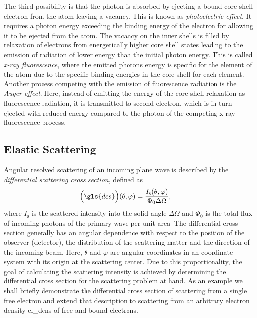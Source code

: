 \begin{description}
          {The third possibility is that the photon is absorbed by ejecting a bound core shell electron from the atom leaving a vacancy. This is known as \emph{photoelectric effect}. It requires a photon energy exceeding the binding energy of the electron for allowing it to be ejected from the atom. The vacancy on the inner shells is filled by relaxation of electrons from energetically higher core shell states leading to the emission of radiation of lower energy than the initial photon energy. This is called \emph{x-ray fluorescence}, where the emitted photons energy is specific for the element of the atom due to the specific binding energies in the core shell for each element. Another process competing with the emission of fluorescence radiation is the \emph{Auger effect}. Here, instead of emitting the energy of the core shell relaxation as fluorescence radiation, it is transmitted to second electron, which is in turn ejected with reduced energy compared to the photon of the competing x-ray fluorescence process.}
\end{description}

\subsection{Elastic Scattering} \label{ch_theo:sec_elastic_scattering}
Angular resolved scattering of an incoming plane wave is described by the \emph{differential scattering cross section}, defined as
\begin{align}
\Big(\gls{dcs}\Big)(\theta, \varphi) &= \frac{I_\text{s}(\theta, \varphi)}{\Phi_0 \Delta \Omega}\text{,}
\end{align}
where $I_\text{s}$ is the scattered intensity into the solid angle $\Delta \Omega$ and $\Phi_0$ is the total flux of incoming photons of the primary wave per unit area. The differential cross section generally has an angular dependence with respect to the position of the observer (detector), the distribution of the scattering matter and the direction of the incoming beam. Here, $\theta$ and $\varphi$ are angular coordinates in an coordinate system with its origin at the scattering center. Due to this proportionality, the goal of calculating the scattering intensity is achieved by determining the differential cross section for the scattering problem at hand. As an example we shall briefly demonstrate the differential cross section of scattering from a single free electron and extend that description to scattering from an arbitrary electron density \gls{el_dens} of free and bound electrons.

